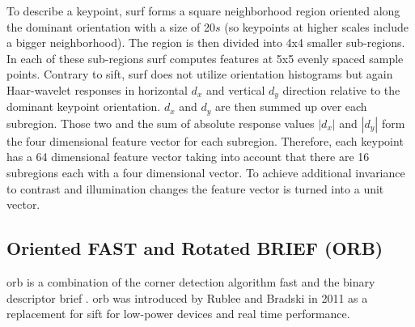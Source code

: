 To describe a keypoint, \gls{surf} forms a square neighborhood region oriented along the dominant orientation with a size of 20$s$ {(so keypoints at higher scales include a bigger neighborhood)}. The region is then divided into 4x4 smaller sub-regions. In each of these sub-regions \gls{surf} computes features at 5x5 evenly spaced sample points. Contrary to \gls{sift}, \gls{surf} does not utilize orientation histograms but again Haar-wavelet responses in horizontal $d_x$ and vertical $d_y$ direction relative to the dominant keypoint orientation. $d_x$ and $d_y$ are then summed up over each subregion. Those two and the sum of absolute response values $|d_x|$ and $|d_y|$ form the four dimensional feature vector for each subregion. Therefore, each keypoint has a 64 dimensional feature vector taking into account that there are 16 subregions each with a four dimensional vector. To achieve additional invariance to contrast and illumination changes the feature vector is turned into a unit vector.    

\subsection[ORB]{Oriented FAST and Rotated BRIEF (ORB)}
\gls{orb} is a combination of the corner detection algorithm \gls{fast} \cite{Rosten} and the binary descriptor \gls{brief} \cite{Calonder2010}. \gls{orb} was introduced by Rublee and Bradski in 2011 \cite{Rublee2011} as a replacement for \gls{sift} for low-power devices and real time performance.

